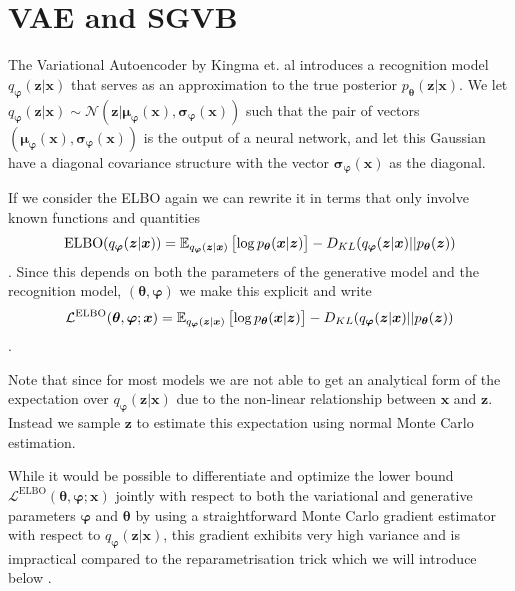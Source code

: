 \section{VAE and SGVB}

The Variational Autoencoder by Kingma et. al \cite{kingma_auto-encoding_2013}
introduces a recognition model $q_{\bm{\varphi}}(\bm{z} | \bm{x})$ that serves as
an approximation to the true posterior $p_{\bm{\theta}}( \bm{z} | \bm{x})$. We let $q_{\bm{\varphi}}(\bm{z} | \bm{x}) \sim
\mathcal{N}(\bm{z}| \bm{\mu_{\bm{\varphi}}}(\bm{x}),
\bm{\sigma}_{\bm{\varphi}}(\bm{x}))$ such that the pair of vectors
$(\bm{\mu}_{\bm{\varphi}}(\bm{x}), \bm{\sigma}_{\bm{\varphi}}(\bm{x}))$ is the
output of a neural network, and let this Gaussian have a diagonal covariance
structure with the vector $\bm{\sigma}_{\bm{\varphi}}(\bm{x})$ as the diagonal.

If we consider the ELBO again we can rewrite it in terms that only involve known
functions and quantities
\begin{equation}
  \label{eq:ELBO_VAE}
  \text{ELBO}(q_{\bm{\varphi}}(\bm{z} | \bm{x})) = \operatorname{\mathbb{E}}_{q_{\bm{\varphi}}(\bm{z} | \bm{x})}\left[ \log p_{\bm{\theta}}(\bm{x} | \bm{z}) \right] - D_{KL}(q_{\bm{\varphi}}(\bm{z} | \bm{x}) || p_{\bm{\theta}}(\bm{z}))
\end{equation}.
Since this depends on both the parameters of the generative model and the
recognition model, $(\bm{\theta}, \bm{\varphi})$ we make this explicit and write
\begin{equation}
  \label{eq:VAE_ELBO}
  \mathcal{L}^{\text{ELBO}}(\bm{\theta}, \bm{\varphi} ; \bm{x}) = \operatorname{\mathbb{E}}_{q_{\bm{\varphi}}(\bm{z} | \bm{x})}\left[ \log p_{\bm{\theta}}(\bm{x} | \bm{z}) \right] - D_{KL}(q_{\bm{\varphi}}(\bm{z} | \bm{x}) || p_{\bm{\theta}}(\bm{z}))
\end{equation}.

Note that since for most models we are not able to get an analytical form of the
expectation over $q_{\bm{\varphi}}(\bm{z} | \bm{x})$ due to the non-linear
relationship between $\bm{x}$ and $\bm{z}$. Instead we sample $\bm{z}$ to
estimate this expectation using normal Monte Carlo estimation.

While it would be possible to differentiate and optimize the lower bound
$\mathcal{L}^{\text{ELBO}}(\bm{\theta}, \bm{\varphi} ; \bm{x})$ jointly with
respect to both the variational and generative parameters $\bm{\varphi}$ and
$\bm{\theta}$ by using a straightforward Monte Carlo gradient estimator with respect
to $q_{\bm{\varphi}}(\bm{z} | \bm{x})$, this gradient exhibits very high
variance and is impractical compared to the reparametrisation trick which we will introduce below \cite{kingma_auto-encoding_2013}.

